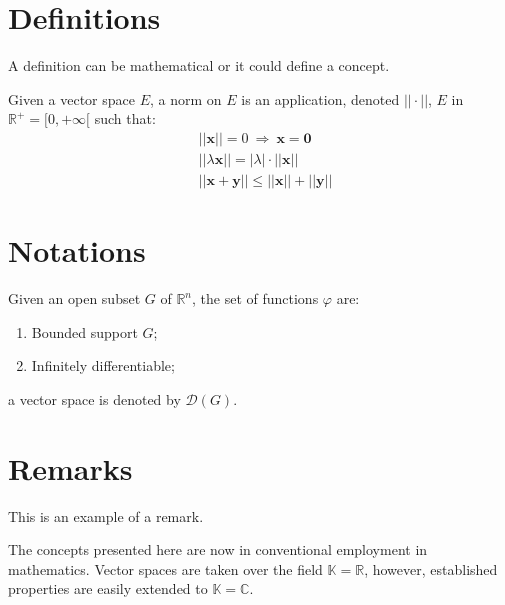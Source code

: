 \documentclass[
	11pt, %
	fleqn, %
	letterpaper, %
]{CommodoreBlueBook}
\begin{document}

\section{Definitions}

A definition can be mathematical or it could define a concept.

\begin{definition}[Definition name] %
	Given a vector space $E$, a norm on $E$ is an application, denoted $||\cdot||$, $E$ in $\mathbb{R}^+=[0,+\infty[$ such that:
	\begin{align}
		& ||\mathbf{x}||=0\ \Rightarrow\ \mathbf{x}=\mathbf{0}\\
		& ||\lambda \mathbf{x}||=|\lambda|\cdot ||\mathbf{x}||\\
		& ||\mathbf{x}+\mathbf{y}||\leq ||\mathbf{x}||+||\mathbf{y}||
	\end{align}
\end{definition}


\section{Notations}

\begin{notation} %
	Given an open subset $G$ of $\mathbb{R}^n$, the set of functions $\varphi$ are:
	\begin{enumerate}
		\item Bounded support $G$;
		\item Infinitely differentiable;
	\end{enumerate}
	a vector space is denoted by $\mathcal{D}(G)$. 
\end{notation}


\section{Remarks}

This is an example of a remark.

\begin{remark}

	The concepts presented here are now in conventional employment in
	mathematics. Vector spaces are taken over the field
	$\mathbb{K}=\mathbb{R}$, however, established properties are easily
	extended to $\mathbb{K}=\mathbb{C}$.

\end{remark}
\end{document}
